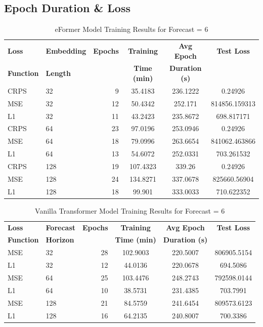 \documentclass{article}
\begin{document}
\subsection{Epoch Duration \& Loss}

\begin{table}[!htbp]
    \footnotesize
    \centering
    \caption{eFormer Model Training Results for Forecast = 6}
    \begin{tabular}{l|l|r|S|S|S}
        \toprule
        \textbf{Loss} & \textbf{Embedding} & \textbf{Epochs} & \textbf{Training} & \textbf{Avg Epoch} & \textbf{Test Loss} \\
        \textbf{Function} & \textbf{Length} & & \textbf{Time (min)} & \textbf{Duration (s)} & \\
        \midrule
            CRPS & 32 & 9 & 35.4183 & 236.1222 & 0.24926 \\
        MSE & 32 & 12 & 50.4342 & 252.171 & 814856.159313 \\
        L1 & 32 & 11 & 43.2423 & 235.8672 & 698.817171 \\
        \midrule
        CRPS & 64 & 23 & 97.0196 & 253.0946 & 0.24926 \\
        MSE & 64 & 18 & 79.0996 & 263.6654 & 841062.463866 \\
        L1 & 64 & 13 & 54.6072 & 252.0331 & 703.261532 \\
        \midrule
        CRPS & 128 & 19 & 107.4323 & 339.26 & 0.24926 \\
        MSE & 128 & 24 & 134.8271 & 337.0678 & 825660.56904 \\
        L1 & 128 & 18 & 99.901 & 333.0033 & 710.622352 \\
      \bottomrule
    \end{tabular}
    \label{tab:eformer_training_f6}
    \end{table}

\begin{table}[!htbp]
    \centering
    \footnotesize
    \caption{Vanilla Transformer Model Training Results for Forecast = 6}
    \begin{tabular}{l|l|r|S|S|S}
        \toprule
        \textbf{Loss} & \textbf{Forecast} & \textbf{Epochs} & \textbf{Training} & \textbf{Avg Epoch} & \textbf{Test Loss} \\
        \textbf{Function} & \textbf{Horizon} & & \textbf{Time (min)} & \textbf{Duration (s)} & \\
        \midrule
        MSE & 32 & 28 & 102.9003 & 220.5007 & 806905.5154 \\
        L1 & 32 & 12 & 44.0136 & 220.0678 & 694.5086 \\
        \midrule
        MSE & 64 & 25 & 103.4476 & 248.2743 & 792598.0144 \\
        L1 & 64 & 10 & 38.5731 & 231.4385 & 703.7991 \\
        \midrule
        MSE & 128 & 21 & 84.5759 & 241.6454 & 809573.6123 \\
        L1 & 128 & 16 & 64.2135 & 240.8007 & 700.3386 \\
      \bottomrule
    \end{tabular}
    \label{tab:vanillatransformer_training_f6}
    \end{table}
\end{document}
